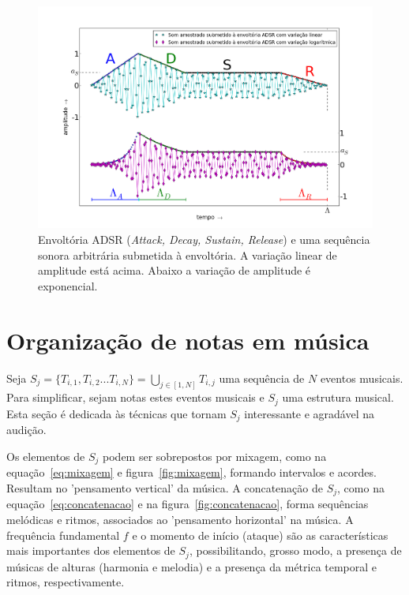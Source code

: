 \begin{figure}[htpq!]
    \centering
        \includegraphics[width=\textwidth]{figuras/adsr}
    \caption{Envoltória ADSR (\emph{Attack, Decay, Sustain, Release}) e uma sequência sonora arbitrária submetida à envoltória. A variação linear de amplitude está acima. Abaixo a variação de amplitude é exponencial.}
\end{figure}
        \label{fig:adsr}



\clearpage
\section{Organização de notas em música}\label{notasMusica}
Seja $ S_j=\{T_{i,1},T_{i,2}...T_{i,N}\} =\bigcup_{j \in [1,N]} T_{i,j} $ uma sequência de $N$ eventos
musicais. Para simplificar, sejam notas estes eventos musicais
e $S_j$ uma estrutura musical. Esta seção é dedicada às técnicas
que tornam $S_j$ interessante e agradável na audição.

Os elementos de $S_j$ podem ser sobrepostos por mixagem, como na equação~\ref{eq:mixagem} e figura~\ref{fig:mixagem}, formando intervalos e acordes. Resultam no 'pensamento vertical' da música. A concatenação de $S_j$, como na equação~\ref{eq:concatenacao} e na figura~\ref{fig:concatenacao}, forma sequências melódicas e ritmos, associados ao 'pensamento horizontal' na música. A frequência fundamental $f$ e o momento de início (ataque) são as características mais importantes dos elementos de $S_j$, possibilitando, grosso modo, a presença de músicas de alturas (harmonia e melodia) e a presença da métrica temporal e ritmos, respectivamente.



